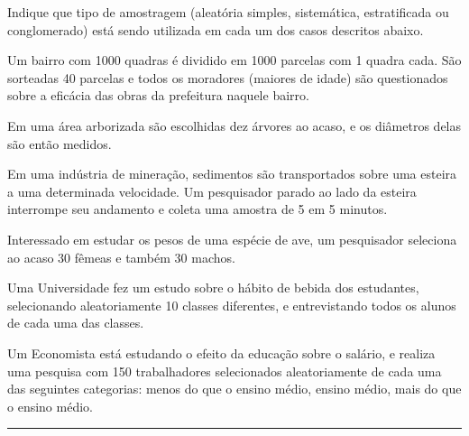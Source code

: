 \documentclass[a4paper,11pt,fleqn]{article}\usepackage[]{graphicx}\usepackage[]{color}
\theoremstyle{definition}
\begin{document}
\begin{compactenum}[3.]
\item Indique que tipo de amostragem (aleatória simples, sistemática,
  estratificada ou conglomerado) está sendo
  utilizada em cada um dos casos descritos abaixo.
  \begin{compactenum}
  \item Um bairro com 1000 quadras é dividido em 1000 parcelas com 1
    quadra cada. São sorteadas 40 parcelas e todos os moradores (maiores
    de idade) são questionados sobre a eficácia das obras da prefeitura
    naquele bairro.
  \item Em uma área arborizada são escolhidas dez árvores ao acaso, e os
    diâmetros delas são então medidos.
  \item Em uma indústria de mineração, sedimentos são transportados
    sobre uma esteira a uma determinada velocidade. Um
    pesquisador parado ao lado da esteira interrompe seu andamento e
    coleta uma amostra de 5 em 5 minutos.
  \item Interessado em estudar os pesos de uma espécie de ave, um
    pesquisador seleciona ao acaso 30 fêmeas e também 30 machos.
  \item Uma Universidade fez um estudo sobre o hábito de bebida dos
    estudantes, selecionando aleatoriamente 10 classes diferentes, e
    entrevistando todos os alunos de cada uma das classes.
  \item Um Economista está estudando o efeito da educação sobre o
    salário, e realiza uma pesquisa com 150 trabalhadores selecionados
    aleatoriamente de cada uma das seguintes categorias: menos do que o
    ensino médio, ensino médio, mais do que o ensino médio.
  \end{compactenum}
\end{compactenum}

\vspace{0.3cm}
\hrule
\vspace{0.3cm}
\end{document}
